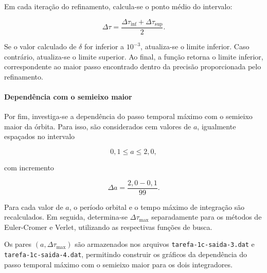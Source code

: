 \documentclass[12pt,a4paper]{article}
\begin{document}
Em cada iteração do refinamento, calcula-se o ponto
médio do intervalo:

\begin{equation}
    \Delta\tau=
    \frac{\Delta\tau_{\mathrm{inf}}+
    \Delta\tau_{\mathrm{sup}}}{2}.
\end{equation}

Se o valor calculado de $\delta$ for inferior a
$10^{-3}$, atualiza-se o limite inferior. Caso
contrário, atualiza-se o limite superior. Ao final,
a função retorna o limite inferior, correspondente
ao maior passo encontrado dentro da precisão
proporcionada pelo refinamento.

\paragraph{Dependência com o semieixo maior}

Por fim, investiga-se a dependência do passo temporal
máximo com o semieixo maior da órbita. Para isso,
são considerados cem valores de $a$, igualmente
espaçados no intervalo

\begin{equation}
    0,1\leq a\leq 2,0,
\end{equation}

com incremento

\begin{equation}
    \Delta a=\frac{2,0-0,1}{99}.
\end{equation}

Para cada valor de $a$, o período orbital e o tempo
máximo de integração são recalculados. Em seguida,
determina-se $\Delta\tau_{\max}$ separadamente
para os métodos de Euler-Cromer e Verlet, utilizando
as respectivas funções de busca.

Os pares $(a,\Delta\tau_{\max})$ são armazenados
nos arquivos \texttt{tarefa-1c-saida-3.dat} e
\texttt{tarefa-1c-saida-4.dat}, permitindo construir
os gráficos da dependência do passo temporal máximo
com o semieixo maior para os dois integradores.
\end{document}
